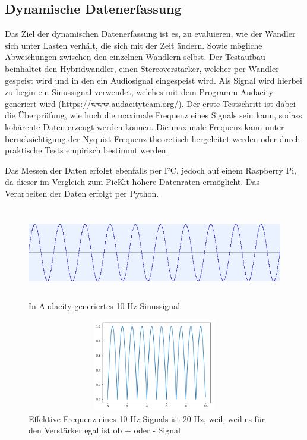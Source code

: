 \subsection{Dynamische Datenerfassung}
\begin{flushleft}



Das Ziel der dynamischen Datenerfassung ist es, zu evaluieren, wie der Wandler sich unter Lasten verhält, die sich mit der Zeit ändern. Sowie mögliche Abweichungen zwischen den einzelnen Wandlern selbst. Der Testaufbau beinhaltet den Hybridwandler, einen Stereoverstärker, welcher per Wandler gespeist wird und in den ein Audiosignal eingespeist wird. Als Signal wird hierbei zu begin ein Sinussignal verwendet, welches mit dem Programm Audacity generiert wird (https://www.audacityteam.org/). Der erste Testschritt ist dabei die Überprüfung, wie hoch die maximale Frequenz eines Signals sein kann, sodass kohärente Daten erzeugt werden können. Die maximale Frequenz kann unter berücksichtigung der Nyquist Frequenz theoretisch hergeleitet werden oder durch praktische Tests empirisch bestimmt werden.  

Das Messen der Daten erfolgt ebenfalls per I²C, jedoch auf einem Raspberry Pi, da dieser im Vergleich zum PicKit höhere Datenraten ermöglicht. Das Verarbeiten der Daten erfolgt per Python. 

\begin{figure}
    \centering
    \includegraphics[height= 4cm, width = 12cm]{Pictures/Sinus_Aud.png}
    \caption{In Audacity generiertes 10 Hz Sinussignal}
\end{figure}

\begin{figure}
    \centering
    \includegraphics[height= 4cm, width = 12cm]{Pictures/Clapped_Sine.png}
    \caption{Effektive Frequenz eines 10 Hz Signals ist 20 Hz, weil, weil es für den Verstärker egal ist ob + oder - Signal }
\end{figure}


\end{flushleft}
